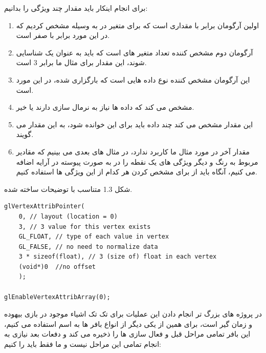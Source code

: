 \documentclass[a4paper, 12pt]{book}
\newcommand{\lrit}[1]{\lr{\textit{#1}}}
\begin{document}
    برای انجام اینکار باید مقدار چند ویژگی را بدانیم:
\begin{persian}
    \begin{enumerate}
      \item اولین آرگومان برابر با مقداری است که برای متغیر  در  به وسیله  مشخص کردیم که در این مورد برابر با صفر است.
      \item آرگومان دوم مشخص کننده تعداد متغیر های است که باید به عنوان یک  شناسایی شوند، این مقدار برای مثال ما برابر 3 است.
      \item این آرگومان مشخص کننده نوع داده هایی است که بارگزاری شده، در این مورد  است.
      \item مشخص می کند که داده ها نیاز به نرمال سازی دارند یا خیر.
      \item این مقدار مشخص می کند چند  داده باید برای این  خوانده شود، به این مقدار  می گویند.
      \item مقدار آخر در مورد مثال ما کاربرد ندارد، در مثال های بعدی می بینیم که مقادیر مربوط به رنگ و دیگر ویژگی های یک نقطه را در به صورت پیوسته در آرایه  اضافه می کنیم، آنگاه باید از  برای مشخص کردن هر کدام از این ویژگی ها استفاده کنیم.
    \end{enumerate}
\end{persian}

    شکل 1.3 متناسب با توضیحات ساخته شده.

    \begin{LTR}
    \small
        \begin{lstlisting}[style=C++Style,caption=\lrit{link vertex attribute to vertex data}]
glVertexAttribPointer(
    0, // layout (location = 0)
    3, // 3 value for this vertex exists
    GL_FLOAT, // type of each value in vertex
    GL_FALSE, // no need to normalize data
    3 * sizeof(float), // 3 (size of) float in each vertex
    (void*)0  //no offset
    );

glEnableVertexAttribArray(0);
        \end{lstlisting}
    \end{LTR}
    \normalsize
    \vspace*{0.3cm}

    در پروژه های بزرگ تر انجام دادن این عملیات برای تک تک اشیاء موجود در بازی بیهوده و زمان گیر است، برای همین از یکی دیگر از انواع بافر ها به اسم  استفاده می کنیم، این بافر تمامی مراحل قبل و فعال سازی  ها را ذخیره می کند و دفعات بعد نیازی به انجام تمامی این مراحل نیست و ما فقط باید  را  کنیم:
\end{document}
